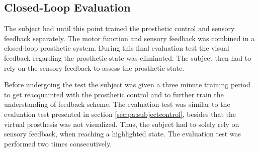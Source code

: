 

\subsection{Closed-Loop Evaluation}

The subject had until this point trained the prosthetic control and sensory feedback separately. The motor function and sensory feedback was combined in a closed-loop prosthetic system. During this final evaluation test the visual feedback regarding the prosthetic state was eliminated. The subject then had to rely on the sensory feedback to assess the prosthetic state. 

Before undergoing the test the subject was given a three minute training period to get reacquainted with the prosthetic control and to further train the understanding of feedback scheme. 
The evaluation test was similar to the evaluation test presented in section \ref{sec:pa:subjectcontrol}, besides that the virtual prosthesis was not visualized. Thus, the subject had to solely rely on sensory feedback, when reaching a highlighted state. The evaluation test was performed two times consecutively.